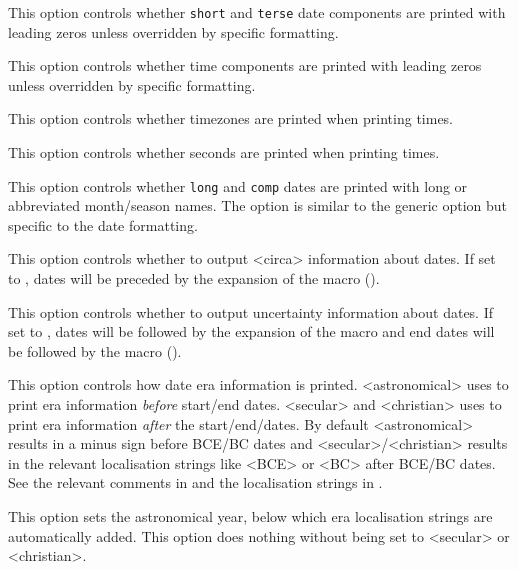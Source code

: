 \documentclass{ltxdockit}[2011/03/25]
\begin{document}
\begin{optionlist}
This option controls whether \texttt{short} and \texttt{terse} date components are printed with leading zeros unless overridden by specific formatting.


This option controls whether time components are printed with leading zeros unless overridden by specific formatting.


This option controls whether timezones are printed when printing times.


This option controls whether seconds are printed when printing times.


This option controls whether \texttt{long} and \texttt{comp} dates are printed with long or abbreviated month/season names. The option is similar to the generic  option but specific to the date formatting.


This option controls whether to output <circa> information about dates. If set to , dates will be preceded by the expansion of the  macro ().


This option controls whether to output uncertainty information about dates. If set to , dates will be followed by the expansion of the  macro and end dates will be followed by the  macro ().


This option controls how date era information is printed. <astronomical> uses  to print era information \emph{before} start/end dates. <secular> and <christian> uses  to print era information \emph{after} the start/end/dates. By default <astronomical> results in a minus sign before BCE/BC dates and <secular>/<christian> results in the relevant localisation strings like <BCE> or <BC> after BCE/BC dates. See the relevant comments in  and the localisation strings in .


This option sets the astronomical year, below which era localisation strings are automatically added. This option does nothing without  being set to <secular> or <christian>.


\end{optionlist}
\end{document}
